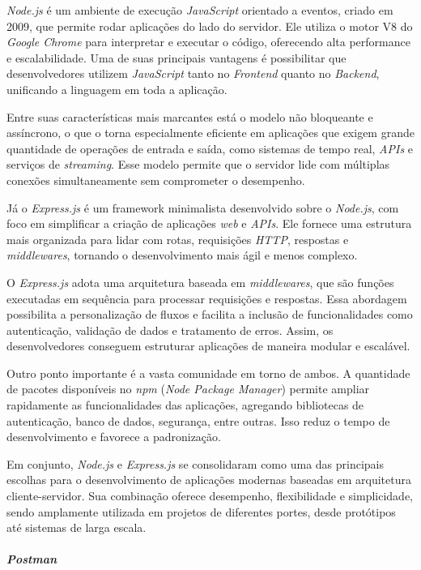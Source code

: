 \documentclass[english,brazilian]{UNISINOSartigo} %
\begin{document}
\textit{Node.js} é um ambiente de execução \textit{JavaScript} orientado a eventos, criado em 2009, que permite rodar aplicações do lado do servidor. Ele utiliza o motor V8 do \textit{Google Chrome} para interpretar e executar o código, oferecendo alta performance e escalabilidade. Uma de suas principais vantagens é possibilitar que desenvolvedores utilizem \textit{JavaScript} tanto no \textit{Frontend} quanto no \textit{Backend}, unificando a linguagem em toda a aplicação.

Entre suas características mais marcantes está o modelo não bloqueante e assíncrono, o que o torna especialmente eficiente em aplicações que exigem grande quantidade de operações de entrada e saída, como sistemas de tempo real, \textit{APIs} e serviços de \textit{streaming}. Esse modelo permite que o servidor lide com múltiplas conexões simultaneamente sem comprometer o desempenho.

Já o \textit{Express.js} é um framework minimalista desenvolvido sobre o \textit{Node.js}, com foco em simplificar a criação de aplicações \textit{web} e \textit{APIs}. Ele fornece uma estrutura mais organizada para lidar com rotas, requisições \textit{HTTP}, respostas e \textit{middlewares}, tornando o desenvolvimento mais ágil e menos complexo.

O \textit{Express.js} adota uma arquitetura baseada em \textit{middlewares}, que são funções executadas em sequência para processar requisições e respostas. Essa abordagem possibilita a personalização de fluxos e facilita a inclusão de funcionalidades como autenticação, validação de dados e tratamento de erros. Assim, os desenvolvedores conseguem estruturar aplicações de maneira modular e escalável.

Outro ponto importante é a vasta comunidade em torno de ambos. A quantidade de pacotes disponíveis no \textit{npm} (\textit{Node Package Manager}) permite ampliar rapidamente as funcionalidades das aplicações, agregando bibliotecas de autenticação, banco de dados, segurança, entre outras. Isso reduz o tempo de desenvolvimento e favorece a padronização.

Em conjunto, \textit{Node.js} e \textit{Express.js} se consolidaram como uma das principais escolhas para o desenvolvimento de aplicações modernas baseadas em arquitetura cliente-servidor. Sua combinação oferece desempenho, flexibilidade e simplicidade, sendo amplamente utilizada em projetos de diferentes portes, desde protótipos até sistemas de larga escala.

\paragraph{\textit{Postman}}
\end{document}
